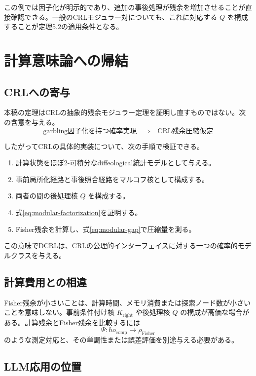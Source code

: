 \documentclass[a4paper,11pt]{ltjsarticle}
\theoremstyle{definition}
\theoremstyle{plain}
\begin{document}
この例では因子化が明示的であり、追加の事後処理が残余を増加させることが直接確認できる。一般のCRLモジュラー対についても、これに対応する $Q$ を構成することが定理5.2の適用条件となる。

\section{計算意味論への帰結}

\subsection{CRLへの寄与}

本稿の定理はCRLの抽象的残余モジュラー定理を証明し直すものではない。次の含意を与える。
\begin{equation}
 \text{garbling因子化を持つ確率実現}
 \quad\Longrightarrow\quad
 \text{CRL残余圧縮仮定}
 \label{eq:semantic-implication}
\end{equation}

したがってCRLの具体的実装について、次の手順で検証できる。
\begin{enumerate}
 \item 計算状態をほぼ2-可積分なdiffeological統計モデルとして与える。
 \item 事前局所化経路と事後照合経路をマルコフ核として構成する。
 \item 両者の間の後処理核 $Q$ を構成する。
 \item 式\eqref{eq:modular-factorization}を証明する。
 \item Fisher残余を計算し、式\eqref{eq:modular-gap}で圧縮量を測る。
\end{enumerate}

この意味でDCRLは、CRLの公理的インターフェイスに対する一つの確率的モデルクラスを与える。

\subsection{計算費用との相違}

Fisher残余が小さいことは、計算時間、メモリ消費または探索ノード数が小さいことを意味しない。事前条件付け核 $K_{\mathrm{right}}$ や後処理核 $Q$ の構成が高価な場合がある。計算残余とFisher残余を比較するには
\begin{equation}
 \Psi:
ho_{\mathrm{comp}}
 \longrightarrow
 \rho_{\mathrm{Fisher}}
\end{equation}
のような測定対応と、その単調性または誤差評価を別途与える必要がある。

\subsection{LLM応用の位置}
\end{document}
